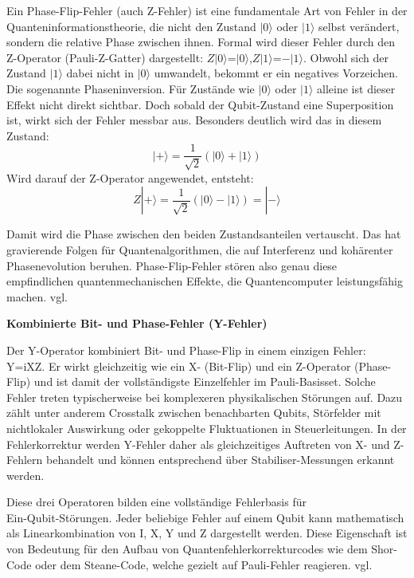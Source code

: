 Ein Phase-Flip-Fehler (auch Z-Fehler) ist eine fundamentale Art von Fehler in der Quanteninformationstheorie, die nicht den Zustand $|0\rangle$ oder $|1\rangle$ selbst verändert, sondern die relative Phase zwischen ihnen. Formal wird dieser Fehler durch den Z-Operator (Pauli-Z-Gatter) dargestellt: $Z|0\rangle$=$|0\rangle$,$Z|1\rangle$=$-|1\rangle$. Obwohl sich der Zustand $|1\rangle$ dabei nicht in $|0\rangle$ umwandelt, bekommt er ein negatives Vorzeichen. Die sogenannte Phaseninversion. Für Zustände wie $|0\rangle$ oder $|1\rangle$ alleine ist dieser Effekt nicht direkt sichtbar. Doch sobald der Qubit-Zustand eine Superposition ist, wirkt sich der Fehler messbar aus. Besonders deutlich wird das in diesem Zustand: \[
|+\rangle = \frac{1}{\sqrt{2}}(|0\rangle + |1\rangle)
\]
Wird darauf der Z-Operator angewendet, entsteht:
\[
Z|+\rangle = \frac{1}{\sqrt{2}}(|0\rangle - |1\rangle) = |-\rangle
\]

Damit wird die Phase zwischen den beiden Zustandsanteilen vertauscht. Das hat gravierende Folgen für Quantenalgorithmen, die auf Interferenz und kohärenter Phasenevolution beruhen. Phase-Flip-Fehler stören also genau diese empfindlichen quantenmechanischen Effekte, die Quantencomputer leistungsfähig machen. vgl. \cite[Seite 251-252]{rieffelQuantumComputingGentle2011a}\medskip



\textbf{Kombinierte Bit- und Phase-Fehler (Y-Fehler)}

Der Y-Operator kombiniert Bit- und Phase-Flip in einem einzigen Fehler: Y=iXZ. Er wirkt gleichzeitig wie ein X- (Bit-Flip) und ein Z-Operator (Phase-Flip) und ist damit der vollständigste Einzelfehler im Pauli-Basisset. Solche Fehler treten typischerweise bei komplexeren physikalischen Störungen auf. Dazu zählt unter anderem Crosstalk zwischen benachbarten Qubits, Störfelder mit nichtlokaler Auswirkung oder gekoppelte Fluktuationen in Steuerleitungen. In der Fehlerkorrektur werden Y-Fehler daher als gleichzeitiges Auftreten von X- und Z-Fehlern behandelt und können entsprechend über Stabiliser-Messungen erkannt werden.

Diese drei Operatoren bilden eine vollständige Fehlerbasis für \\ Ein-Qubit-Störungen. Jeder beliebige Fehler auf einem Qubit kann mathematisch als Linearkombination von I, X, Y und Z dargestellt werden. Diese Eigenschaft ist von Bedeutung für den Aufbau von Quantenfehlerkorrekturcodes wie dem Shor-Code oder dem Steane-Code, welche gezielt auf Pauli-Fehler reagieren.  vgl. \cite[Seite 252-253]{rieffelQuantumComputingGentle2011a}\medskip



